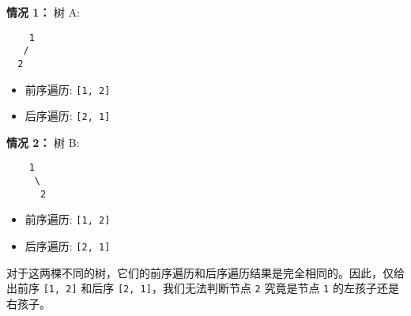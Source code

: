 \textbf{情况 1：} 树 A:

\begin{lstlisting}
    1
   /
  2
\end{lstlisting}
\begin{itemize}
	\item 前序遍历: \lstinline{[1, 2]}
	\item 后序遍历: \lstinline{[2, 1]}
\end{itemize}

\textbf{情况 2：} 树 B:

\begin{lstlisting}
    1
     \
      2
\end{lstlisting}
\begin{itemize}
	\item 前序遍历: \lstinline{[1, 2]}
	\item 后序遍历: \lstinline{[2, 1]}
\end{itemize}

对于这两棵不同的树，它们的前序遍历和后序遍历结果是完全相同的。因此，仅给出前序 \lstinline{[1, 2]} 和后序 \lstinline{[2, 1]}，我们无法判断节点 \lstinline{2} 究竟是节点 \lstinline{1} 的左孩子还是右孩子。
